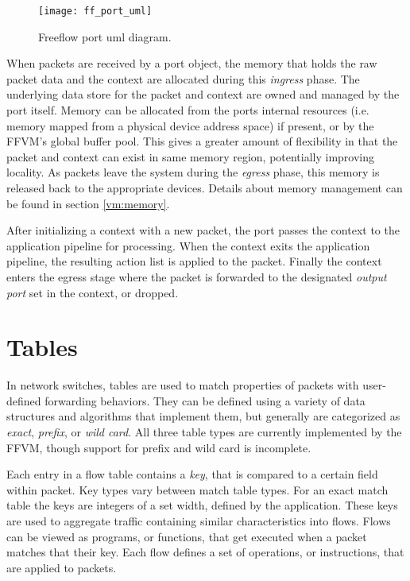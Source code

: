 \begin{figure}[h]
\centering
\texttt{[image: ff\_port\_uml]}
\caption{Freeflow port uml diagram.}
\label{port_uml}
\end{figure}

When packets are received by a port object, the memory that holds the raw
packet data and the context are allocated during this \emph{ingress} phase. The
underlying data store for the packet and context are owned and managed by the
port itself. Memory can be allocated from the ports internal resources (i.e.
memory mapped from a physical device address space) if present, or by the FFVM's
global buffer pool. This gives a greater amount of flexibility in that the
packet and context can exist in same memory region, potentially improving
locality. As packets leave the system during the \emph{egress} phase, this
memory is released back to the appropriate devices. Details about memory
management can be found in section \ref{vm:memory}.

After initializing a context with a new packet, the port passes the context to
the application pipeline for processing. When the context exits the application
pipeline, the resulting action list is applied to the packet. Finally the
context enters the egress stage where the packet is forwarded to the designated
\emph{output port} set in the context, or dropped.


\section{Tables}
\label{vm:tables}
In network switches, tables are used to match properties of packets
with user-defined forwarding behaviors. They can be defined using a variety of
data structures and algorithms that implement them, but generally are categorized
as \emph{exact}, \emph{prefix}, or \emph{wild card}. All three table types are
currently implemented by the FFVM, though support for prefix and wild card is
incomplete.

Each entry in a flow table contains a \emph{key}, that is compared to a
certain field within packet. Key types vary between match table types. For an
exact match table the keys are integers of a set width, defined by the
application. These keys are used to aggregate traffic containing similar
characteristics into flows. Flows can be viewed as programs, or functions,
that get executed when a packet matches that their key. Each flow defines a
set of operations, or instructions, that are applied to packets.


